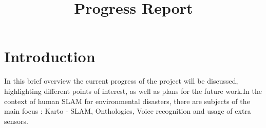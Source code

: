 \documentclass[conference]{IEEEtran}
\title{Progress Report}
\begin{document}
\maketitle



\section{Introduction}
In this brief overview the current progress of the project will be discussed, highlighting different
points of interest, as well as plans for the future work.In the context of human SLAM for environmental disasters, there are
subjects of the main focus : Karto - SLAM, Onthologies, Voice recognition and usage of extra sensors. 
\end{document}
